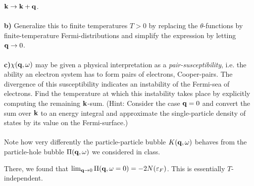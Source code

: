 \begin{problem}
${\bf k} \to {\bf k} +{\bf q}$.
\ \\
\ \\
{\bf b)} Generalize this to finite temperatures $T>0$ by replacing the $\theta$-functions by finite-temperature Fermi-distributions and simplify the expression by letting ${\bf q} \to 0$.   
\ \\
\ \\
{\bf c)}$\chi({\bf q}, \omega)$ may be given a physical interpretation as a {\it pair-susceptibility}, i.e. the ability an electron system has to form pairs of electrons, Cooper-pairs. The divergence of this susceptibility indicates an instability of the Fermi-sea of electrons. Find the temperature at which this instability takes place by explicitly computing the remaining ${\bf k}$-sum. (Hint: Consider the case ${\bf q}=0$ and convert the sum over ${\bf k}$ to an energy integral and approximate the single-particle density of states by its value on the Fermi-surface.)
\ \\
\ \\
Note how very differently the particle-particle bubble $K({\bf q},\omega)$ behaves from the particle-hole bubble
$\Pi({\bf q},\omega) $ we considered in class.
\begin{center}
\end{center}
There, we found that $\lim_{{\bf q} \to 0} \Pi({\bf q},\omega=0) = - 2 N(\varepsilon_F)$. This is essentially $T$-independent. 
\end{problem}


